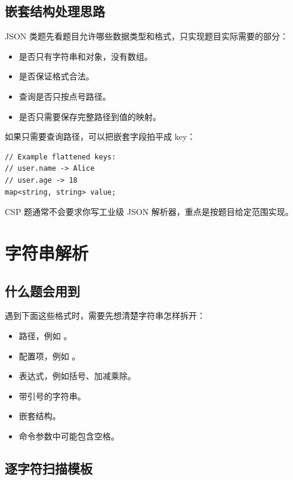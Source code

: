 \subsection{嵌套结构处理思路}

JSON 类题先看题目允许哪些数据类型和格式，只实现题目实际需要的部分：

\begin{itemize}
  \item 是否只有字符串和对象，没有数组。
  \item 是否保证格式合法。
  \item 查询是否只按点号路径。
  \item 是否只需要保存完整路径到值的映射。
\end{itemize}

如果只需要查询路径，可以把嵌套字段拍平成 key：

\begin{lstlisting}
// Example flattened keys:
// user.name -> Alice
// user.age -> 18
map<string, string> value;
\end{lstlisting}

CSP 题通常不会要求你写工业级 JSON 解析器，重点是按题目给定范围实现。

\section{字符串解析}\label{sec:07-21}

\subsection{什么题会用到}

遇到下面这些格式时，需要先想清楚字符串怎样拆开：

\begin{itemize}
  \item 路径，例如 。
  \item 配置项，例如 。
  \item 表达式，例如括号、加减乘除。
  \item 带引号的字符串。
  \item 嵌套结构。
  \item 命令参数中可能包含空格。
\end{itemize}

\subsection{逐字符扫描模板}

